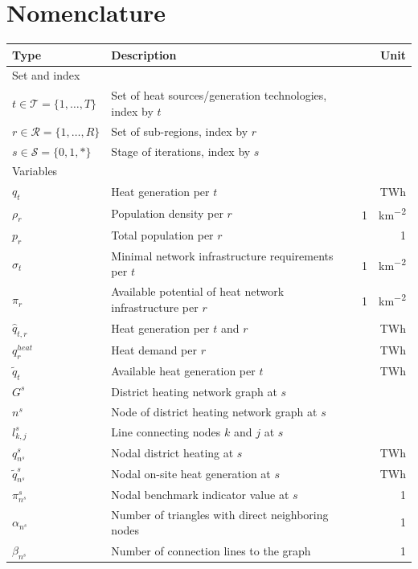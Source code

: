 \documentclass[review]{elsarticle}
\begin{document}
\section*{Nomenclature}
\begin{center}
	\renewcommand{\arraystretch}{1.1}
	\centering
	\small
	\begin{tabular}{lm{8cm}r}
		Type & Description & Unit\\
		\hline
		Set and index & & \\
		\hline
		{$t \in \mathcal{T}=\{1,\ldots,T\}$} & Set of heat sources/generation technologies, index by $t$\\
		{$r \in \mathcal{R}=\{1,\ldots,R\}$} & Set of sub-regions, index by $r$\\
		{$s \in \mathcal{S}=\{0,1,*\}$} & Stage of iterations, index by $s$\\
		\hline
		Variables\\
		\hline
		{$q_{t}$} & Heat generation per $t$ & \SI{}{TWh}\\
		{$\rho_{r}$} & Population density per $r$ & \SI{}{1 \per \per km^2}\\
		{$p_{r}$} & Total population per $r$ & \SI{}{1}\\
		{$\sigma_{t}$} & Minimal network infrastructure requirements per $t$& \SI{}{1 \per \per km^2}\\
		{$\pi_{r}$} & Available potential of heat network infrastructure per $r$& \SI{}{1 \per \per km^2}\\
		{$\hat{q}_{t,r}$} & Heat generation per $t$ and $r$& \SI{}{TWh}\\
		{$q^{heat}_{r}$} & Heat demand per $r$& \SI{}{TWh}\\
		{$\tilde{q}_{t}$} & Available heat generation per $t$& \SI{}{TWh}\\
		{$G^{s}$} & District heating network graph at $s$ & \\
		{$n^{s}$} & Node of district heating network graph at $s$ & \\
		{$l^{s}_{k,j}$} & Line connecting nodes $k$ and $j$ at $s$ & \\
		{$q^{s}_{n^{s}}$} & Nodal district heating at $s$ & \SI{}{TWh}\\
		{$\tilde{q}^{s}_{n^{s}}$} & Nodal on-site heat generation at $s$ & \SI{}{TWh}\\
		{$\pi^{s}_{n^{s}}$} & Nodal benchmark indicator value at $s$ & \SI{}{1}\\
		{$\alpha_{n^{s}}$} & Number of triangles with direct neighboring nodes & \SI{}{1}\\
		{$\beta_{n^{s}}$} & Number of connection lines to the graph & \SI{}{1}\\		
		\hline
	\end{tabular}
\end{center}
\newpage
\end{document}
